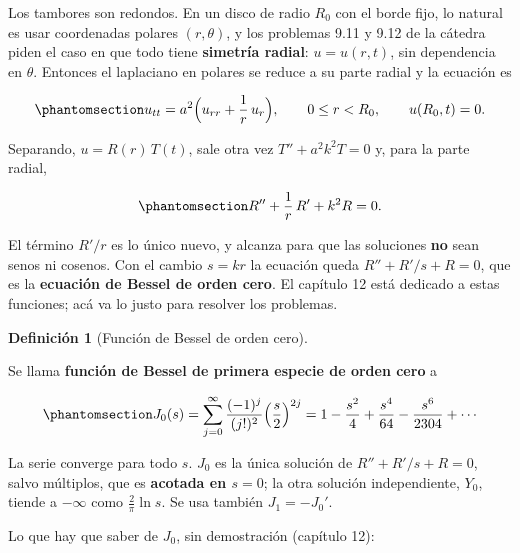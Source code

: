 \documentclass[
  spanish,
  a4paper,
]{scrbook}
\theoremstyle{definition}
\newtheorem{definition}{Definición}[chapter]
\theoremstyle{plain}
\theoremstyle{definition}
\theoremstyle{plain}
\theoremstyle{definition}
\theoremstyle{remark}
\begin{document}
Los tambores son redondos. En un disco de radio \(R_0\) con el borde
fijo, lo natural es usar coordenadas polares \((r,\theta)\), y los
problemas 9.11 y 9.12 de la cátedra piden el caso en que todo tiene
\textbf{simetría radial}: \(u = u(r,t)\), sin dependencia en \(\theta\).
Entonces el laplaciano en polares se reduce a su parte radial y la
ecuación es

\begin{equation}\protect\phantomsection\label{eq-hip-circular}{
u_{tt} = a^2\Big(u_{rr} + \frac1r\,u_r\Big), \qquad 0\le r<R_0, \qquad u(R_0,t) = 0 .
}\end{equation}

Separando, \(u = R(r)\,T(t)\), sale otra vez \(T'' + a^2k^2T = 0\) y,
para la parte radial,

\begin{equation}\protect\phantomsection\label{eq-hip-bessel-radial}{
R'' + \frac1r\,R' + k^2R = 0 .
}\end{equation}

El término \(R'/r\) es lo único nuevo, y alcanza para que las soluciones
\textbf{no} sean senos ni cosenos. Con el cambio \(s = kr\) la ecuación
queda \(R'' + R'/s + R = 0\), que es la \textbf{ecuación de Bessel de
orden cero}. El capítulo 12 está dedicado a estas funciones; acá va lo
justo para resolver los problemas.

\begin{definition}[Función de Bessel de orden
cero]\protect\hypertarget{def-hip-bessel-j0}{}\label{def-hip-bessel-j0}

Se llama \textbf{función de Bessel de primera especie de orden cero} a

\begin{equation}\protect\phantomsection\label{eq-hip-j0}{
J_0(s) = \sum_{j=0}^{\infty}\frac{(-1)^j}{(j!)^2}\Big(\frac s2\Big)^{2j}
= 1 - \frac{s^2}{4} + \frac{s^4}{64} - \frac{s^6}{2304} + \cdots
}\end{equation}

La serie converge para todo \(s\). \(J_0\) es la única solución de
\(R'' + R'/s + R = 0\), salvo múltiplos, que es \textbf{acotada en
\(s=0\)}; la otra solución independiente, \(Y_0\), tiende a \(-\infty\)
como \(\tfrac2\pi\ln s\). Se usa también \(J_1 = -J_0'\).

\end{definition}

Lo que hay que saber de \(J_0\), sin demostración (capítulo 12):
\end{document}
